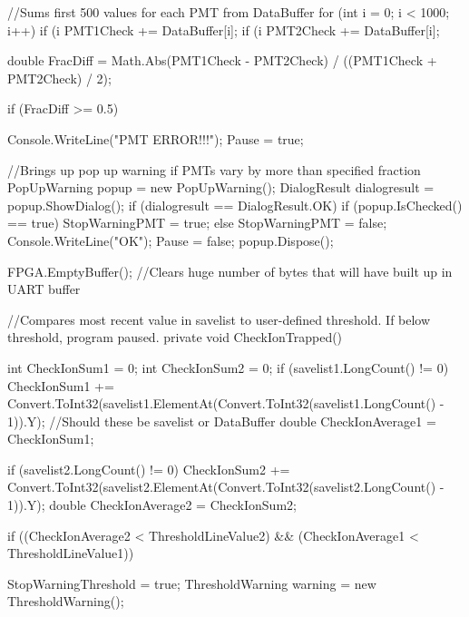 {{{            //Sums first 500 values for each PMT from DataBuffer 
            for (int i = 0; i < 1000; i++)
            {
                if (i %
                {
                    PMT1Check += DataBuffer[i];
                }
                if (i %
                {
                    PMT2Check += DataBuffer[i];
                }
            }

            double FracDiff = Math.Abs(PMT1Check - PMT2Check) / ((PMT1Check + PMT2Check) / 2);
            
            if (FracDiff >= 0.5)
            {
                Console.WriteLine("PMT ERROR!!!");
                Pause = true;
                
                //Brings up pop up warning if PMTs vary by more than specified fraction
                PopUpWarning popup = new PopUpWarning();
                DialogResult dialogresult = popup.ShowDialog();
                if (dialogresult == DialogResult.OK)
                {
                    if (popup.IsChecked() == true)
                    {
                        StopWarningPMT = true;
                    }
                    else
                    {
                        StopWarningPMT = false;
                    }
                    Console.WriteLine("OK");
                    Pause = false;
                }
                popup.Dispose();
            }
            FPGA.EmptyBuffer(); //Clears huge number of bytes that will have built up in UART buffer
        }

        //Compares most recent value in savelist to user-defined threshold. If below threshold, program paused.
        private void CheckIonTrapped()
        {
            int CheckIonSum1 = 0;
            int CheckIonSum2 = 0;
            if (savelist1.LongCount() != 0)
            {
                CheckIonSum1 += Convert.ToInt32(savelist1.ElementAt(Convert.ToInt32(savelist1.LongCount() - 1)).Y); //Should these be savelist or DataBuffer
            }
            double CheckIonAverage1 = CheckIonSum1;

            if (savelist2.LongCount() != 0)
            {
                CheckIonSum2 += Convert.ToInt32(savelist2.ElementAt(Convert.ToInt32(savelist2.LongCount() - 1)).Y);
            }
            double CheckIonAverage2 = CheckIonSum2;


            if ((CheckIonAverage2 < ThresholdLineValue2) && (CheckIonAverage1 < ThresholdLineValue1))
            {
                StopWarningThreshold = true;
                ThresholdWarning warning = new ThresholdWarning();

}}}}
